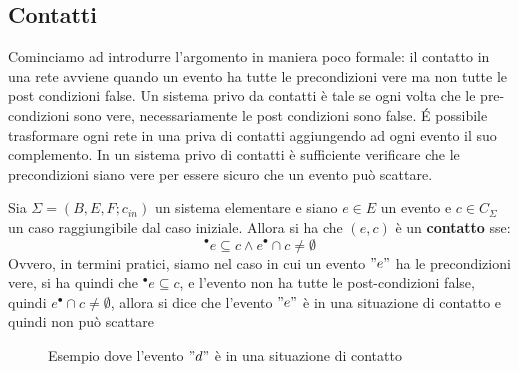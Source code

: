 \subsection{Contatti}
Cominciamo ad introdurre l'argomento in maniera poco formale: il contatto in una rete avviene quando un evento ha tutte le precondizioni vere ma non tutte le post
condizioni false. Un sistema privo da contatti è tale se ogni volta che le pre-condizioni sono vere,
necessariamente le post condizioni sono false. É possibile trasformare ogni rete in una priva di
contatti aggiungendo ad ogni evento il suo complemento. In un sistema privo di contatti è
sufficiente verificare che le precondizioni siano vere per essere sicuro che un evento può scattare.
\begin{definizione}
  Sia $\Sigma = (B, E, F;c_{in})$ un sistema elementare e siano $e\in E$ un evento
  e $c\in C_\Sigma$ un caso raggiungibile dal caso iniziale. Allora si ha che
  $(e, c)$ è un \textbf{contatto} sse:
  \[^\bullet e\subseteq c \wedge e^\bullet \cap c \neq\emptyset\]
  Ovvero, in termini pratici, siamo nel caso in cui un evento $"e"$ ha le
  precondizioni vere, si ha quindi che $^\bullet e\subseteq c$, e l'evento non
  ha tutte le post-condizioni false, quindi $e^\bullet \cap c \neq\emptyset$,
  allora si dice che l'evento $"e"$ è in una situazione di contatto e quindi non
  può scattare
  \begin{figure}[H]
    \centering
    \caption{Esempio dove l'evento $"d"$ è in una situazione di
      contatto}
  \end{figure}
\end{definizione} \vspace{5mm} %
